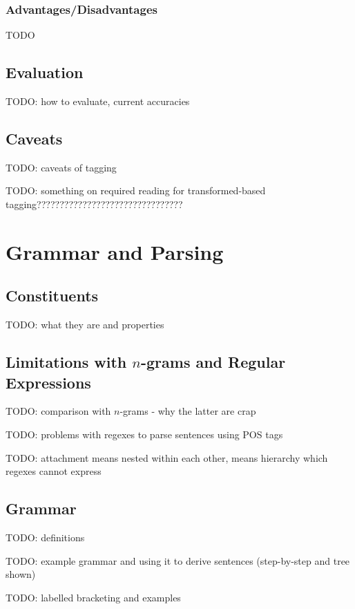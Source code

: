 \documentclass{article}
\begin{document}
\subsubsection{Advantages/Disadvantages}

TODO

\subsection{Evaluation}

TODO: how to evaluate, current accuracies

\subsection{Caveats}

TODO: caveats of tagging

TODO: something on required reading for transformed-based tagging????????????????????????????????

\section{Grammar and Parsing}

\subsection{Constituents}

TODO: what they are and properties

\subsection{Limitations with $n$-grams and Regular Expressions}

TODO: comparison with $n$-grams - why the latter are crap

TODO: problems with regexes to parse sentences using POS tags

TODO: attachment means nested within each other, means hierarchy which regexes cannot express

\subsection{Grammar}

TODO: definitions

TODO: example grammar and using it to derive sentences (step-by-step and tree shown)

TODO: labelled bracketing and examples
\end{document}
